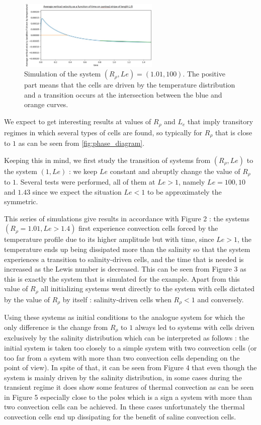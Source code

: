 \documentclass{article}
\begin{document}
\begin{figure}[ht]
  \centering
  \includegraphics[width=0.6\textwidth]{images/last_subsection/fig3.png}
  \caption{Simulation of the system $(R_{\rho},Le) = (1.01,100)$. The positive part means that the cells are driven by the temperature distribution and a transition occurs at the intersection between the blue and orange curves.}
  \label{fig:flux_analysis}
\end{figure}
\par
We expect to get interesting results at values of $R_{\rho}$ and $L_e$ that imply transitory regimes in which several types of cells are found, so typically for $R_{\rho}$ that is close to $1$ as can be seen from \cref{fig:phase_diagram}.
\par 
Keeping this in mind, we first study the transition of systems from $(R_{\rho},Le)$ to the system $(1,Le)$ : we keep $Le$ constant and abruptly change the value of $R_{\rho}$ to $1$. Several tests were performed, all of them at $Le > 1$, namely $Le = 100, 10$ and $1.43$ since we expect the situation $Le < 1$ to be approximately the symmetric.
\par
This series of simulations give results in accordance with Figure 2 : the systems $(R_{\rho} = 1.01, Le > 1.4)$ first experience convection cells forced by the temperature profile due to its higher amplitude but with time, since $Le > 1$, the temperature ends up being dissipated more than the salinity so that the system experiences a transition to salinity-driven cells, and the time that is needed is increased as the Lewis number is decreased. This can be seen from Figure 3 as this is exactly the system that is simulated for the example. Apart from this value of $R_{\rho}$ all initializing systems went directly to the system with cells dictated by the value of $R_{\rho}$ by itself : salinity-driven cells when $R_{\rho} < 1$ and conversely.
\par
Using these systems as initial conditions to the analogue system for which the only difference is the change from $R_{\rho}$ to $1$ always led to systems with cells driven exclusively by the salinity distribution which can be interpreted as follows : the initial system is taken too closely to a simple system with two convection cells (or too far from a system with more than two convection cells depending on the point of view). In spite of that, it can be seen from Figure 4 that even though the system is mainly driven by the salinity distribution, in some cases during the transient regime it does show some features of thermal convection as can be seen in Figure 5 especially close to the poles which is a sign a system with more than two convection cells can be achieved. In these cases unfortunately the thermal convection cells end up dissipating for the benefit of saline convection cells. 
\end{document}
